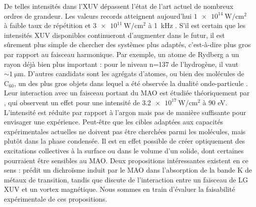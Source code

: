 De telles intensités dans l'XUV dépassent l'état de l'art actuel de nombreux ordres de grandeur. Les valeurs records atteignent aujourd'hui $\SI{1e14}{\W\per\centi\metre\squared}$ à faible taux de répétition  et $\SI{3e11}{\W\per\centi\metre\squared}$ à 1~kHz . S'il est certain que les intensités XUV disponibles continueront d'augmenter dans le futur, il est sûrement plus simple de chercher des systèmes plus adaptés, c'est-à-dire plus gros par rapport au faisceau harmonique. Par exemple, un atome de Rydberg a un rayon déjà bien plus important : pour le niveau n=137 de l'hydrogène, il vaut $\sim\SI{1}{\micro\metre}$. D'autres candidats sont les agrégats d'atomes, ou bien des molécules de $\text{C}_{60}$, un des plus gros objets dans lequel a été observée la dualité onde-particule . Leur interaction avec un faisceau portant du MAO est étudiée théoriquement par , qui observent un effet pour une intensité de $\SI{3.2e17}{\W\per\centi\metre\squared}$ à 90 eV. L'intensité est réduite par rapport à l'argon mais pas de manière suffisante pour envisager une expérience.\linebreak
Peut-être que les cibles adaptées aux capacités expérimentales actuelles ne doivent pas être cherchées parmi les molécules, mais plutôt dans la phase condensée. Il est en effet possible de créer optiquement des excitations collectives à la surface ou dans le volume d'un solide, dont certaines pourraient être sensibles au MAO. Deux propositions intéressantes existent en ce sens :  prédit un dichroïsme induit par le MAO dans l'absorption de la bande K de métaux de transition, tandis que  discute de l'interaction entre un faisceau de LG XUV et un vortex magnétique. Nous sommes en train d'évaluer la faisabilité expérimentale de ces propositions.

